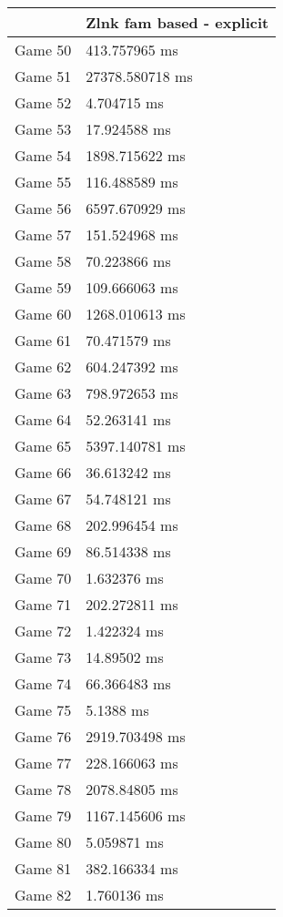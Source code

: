 \begin{tabular}{|l|l|}
	\hline
	& Zlnk fam based - explicit \\ \hline
	Game 50 & 413.757965 ms \\ \hline
	Game 51 & 27378.580718 ms \\ \hline
	Game 52 & 4.704715 ms \\ \hline
	Game 53 & 17.924588 ms \\ \hline
	Game 54 & 1898.715622 ms \\ \hline
	Game 55 & 116.488589 ms \\ \hline
	Game 56 & 6597.670929 ms \\ \hline
	Game 57 & 151.524968 ms \\ \hline
	Game 58 & 70.223866 ms \\ \hline
	Game 59 & 109.666063 ms \\ \hline
	Game 60 & 1268.010613 ms \\ \hline
	Game 61 & 70.471579 ms \\ \hline
	Game 62 & 604.247392 ms \\ \hline
	Game 63 & 798.972653 ms \\ \hline
	Game 64 & 52.263141 ms \\ \hline
	Game 65 & 5397.140781 ms \\ \hline
	Game 66 & 36.613242 ms \\ \hline
	Game 67 & 54.748121 ms \\ \hline
	Game 68 & 202.996454 ms \\ \hline
	Game 69 & 86.514338 ms \\ \hline
	Game 70 & 1.632376 ms \\ \hline
	Game 71 & 202.272811 ms \\ \hline
	Game 72 & 1.422324 ms \\ \hline
	Game 73 & 14.89502 ms \\ \hline
	Game 74 & 66.366483 ms \\ \hline
	Game 75 & 5.1388 ms \\ \hline
	Game 76 & 2919.703498 ms \\ \hline
	Game 77 & 228.166063 ms \\ \hline
	Game 78 & 2078.84805 ms \\ \hline
	Game 79 & 1167.145606 ms \\ \hline
	Game 80 & 5.059871 ms \\ \hline
	Game 81 & 382.166334 ms \\ \hline
	Game 82 & 1.760136 ms \\ \hline

\end{tabular}
